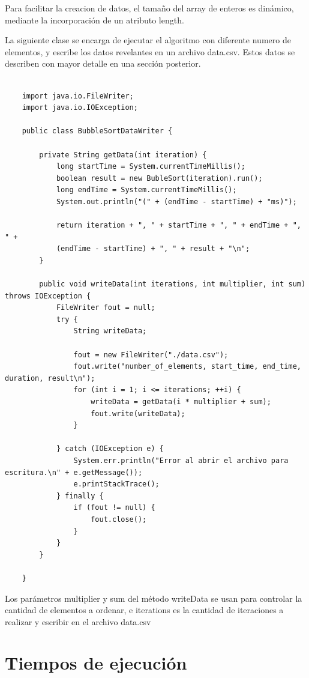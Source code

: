 \documentclass[paper=a4, fontsize=11pt]{scrartcl} %
\numberwithin{equation}{section} %
\numberwithin{figure}{section} %
\numberwithin{table}{section} %
\begin{document}
Para facilitar la creacion de datos, el tamaño del array de enteros es dinámico, mediante la
incorporación de un atributo length.


La siguiente clase se encarga de ejecutar el algoritmo con diferente numero de elementos, y
escribe los datos revelantes en un archivo data.csv. Estos datos se describen con mayor detalle
en una sección posterior.

\begin{lstlisting}

    import java.io.FileWriter;
    import java.io.IOException;

    public class BubbleSortDataWriter {

        private String getData(int iteration) {
            long startTime = System.currentTimeMillis();
            boolean result = new BubleSort(iteration).run();
            long endTime = System.currentTimeMillis();
            System.out.println("(" + (endTime - startTime) + "ms)");

            return iteration + ", " + startTime + ", " + endTime + ", " +
            (endTime - startTime) + ", " + result + "\n";
        }

        public void writeData(int iterations, int multiplier, int sum) throws IOException {
            FileWriter fout = null;
            try {
                String writeData;

                fout = new FileWriter("./data.csv");
                fout.write("number_of_elements, start_time, end_time, duration, result\n");
                for (int i = 1; i <= iterations; ++i) {
                    writeData = getData(i * multiplier + sum);
                    fout.write(writeData);
                }

            } catch (IOException e) {
                System.err.println("Error al abrir el archivo para escritura.\n" + e.getMessage());
                e.printStackTrace();
            } finally {
                if (fout != null) {
                    fout.close();
                }
            }
        }

    }

\end{lstlisting}

    Los parámetros multiplier y sum del método writeData se usan para controlar la cantidad de
    elementos a ordenar, e iterations es la cantidad de iteraciones a realizar y escribir en
    el archivo data.csv

\section{Tiempos de ejecución}\label{sec:tiempos-de-ejecución}
\end{document}
